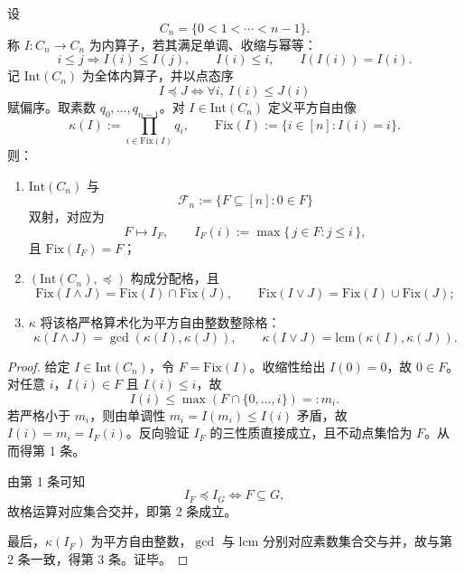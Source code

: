 \begin{theorem}\label{thm:killo-chain-interior-godel-gcd-lcm}
设
\[
C_n=\{0<1<\cdots<n-1\}.
\]
称 \(I:C_n\to C_n\) 为内算子，若其满足单调、收缩与幂等：
\[
i\le j\Rightarrow I(i)\le I(j),\qquad I(i)\le i,\qquad I(I(i))=I(i).
\]
记 \(\mathrm{Int}(C_n)\) 为全体内算子，并以点态序
\[
I\preceq J\iff \forall i,\ I(i)\le J(i)
\]
赋偏序。取素数 \(q_0,\dots,q_{n-1}\)。对 \(I\in\mathrm{Int}(C_n)\) 定义平方自由像
\[
\kappa(I):=\prod_{i\in\mathrm{Fix}(I)}q_i,
\qquad
\mathrm{Fix}(I):=\{i\in[n]:I(i)=i\}.
\]
则：
\begin{enumerate}
  \item \(\mathrm{Int}(C_n)\) 与
  \[
  \mathcal F_n:=\{F\subseteq[n]:0\in F\}
  \]
  双射，对应为
  \[
  F\longmapsto I_F,\qquad
  I_F(i):=\max\{\,j\in F:j\le i\,\},
  \]
  且 \(\mathrm{Fix}(I_F)=F\)；
  \item \((\mathrm{Int}(C_n),\preceq)\) 构成分配格，且
  \[
  \mathrm{Fix}(I\wedge J)=\mathrm{Fix}(I)\cap\mathrm{Fix}(J),\qquad
  \mathrm{Fix}(I\vee J)=\mathrm{Fix}(I)\cup\mathrm{Fix}(J);
  \]
  \item \(\kappa\) 将该格严格算术化为平方自由整数整除格：
  \[
  \kappa(I\wedge J)=\gcd(\kappa(I),\kappa(J)),\qquad
  \kappa(I\vee J)=\mathrm{lcm}(\kappa(I),\kappa(J)).
  \]
\end{enumerate}
\end{theorem}
\begin{proof}
给定 \(I\in\mathrm{Int}(C_n)\)，令 \(F=\mathrm{Fix}(I)\)。收缩性给出 \(I(0)=0\)，故 \(0\in F\)。对任意 \(i\)，\(I(i)\in F\) 且 \(I(i)\le i\)，故
\[
I(i)\le \max(F\cap\{0,\dots,i\})=:m_i.
\]
若严格小于 \(m_i\)，则由单调性
\(
m_i=I(m_i)\le I(i)
\)
矛盾，故 \(I(i)=m_i=I_F(i)\)。反向验证 \(I_F\) 的三性质直接成立，且不动点集恰为 \(F\)。从而得第 1 条。

由第 1 条可知
\[
I_F\preceq I_G\iff F\subseteq G,
\]
故格运算对应集合交并，即第 2 条成立。

最后，\(\kappa(I_F)\) 为平方自由整数，\(\gcd\) 与 \(\mathrm{lcm}\) 分别对应素数集合交与并，故与第 2 条一致，得第 3 条。证毕。
\end{proof}

